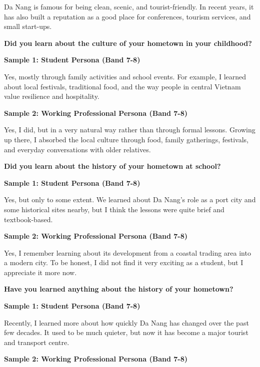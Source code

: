 Da Nang is famous for being clean, scenic, and tourist-friendly. In recent years, it has also built a reputation as a good place for conferences, tourism services, and small start-ups.

\separator

\begin{ieltsquestion}
\textbf{Did you learn about the culture of your hometown in your childhood?}
\end{ieltsquestion}
\textbf{Sample 1: Student Persona (Band 7-8)}

Yes, mostly through family activities and school events. For example, I learned about local festivals, traditional food, and the way people in central Vietnam value resilience and hospitality.

\textbf{Sample 2: Working Professional Persona (Band 7-8)}

Yes, I did, but in a very natural way rather than through formal lessons. Growing up there, I absorbed the local culture through food, family gatherings, festivals, and everyday conversations with older relatives.

\separator

\begin{ieltsquestion}
\textbf{Did you learn about the history of your hometown at school?}
\end{ieltsquestion}
\textbf{Sample 1: Student Persona (Band 7-8)}

Yes, but only to some extent. We learned about Da Nang's role as a port city and some historical sites nearby, but I think the lessons were quite brief and textbook-based.

\textbf{Sample 2: Working Professional Persona (Band 7-8)}

Yes, I remember learning about its development from a coastal trading area into a modern city. To be honest, I did not find it very exciting as a student, but I appreciate it more now.

\separator

\begin{ieltsquestion}
\textbf{Have you learned anything about the history of your hometown?}
\end{ieltsquestion}
\textbf{Sample 1: Student Persona (Band 7-8)}

Recently, I learned more about how quickly Da Nang has changed over the past few decades. It used to be much quieter, but now it has become a major tourist and transport centre.

\textbf{Sample 2: Working Professional Persona (Band 7-8)}

